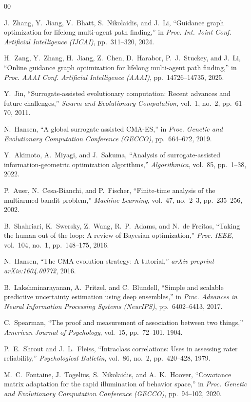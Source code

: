 \documentclass[conference]{IEEEtran}
\begin{document}

\begin{thebibliography}{00}

J.~Zhang, Y.~Jiang, V.~Bhatt, S.~Nikolaidis, and J.~Li,
``Guidance graph optimization for lifelong multi-agent path finding,''
in \textit{Proc. Int. Joint Conf. Artificial Intelligence (IJCAI)},
pp.~311--320, 2024.

H.~Zang, Y.~Zhang, H.~Jiang, Z.~Chen, D.~Harabor, P.~J.~Stuckey,
and J.~Li, ``Online guidance graph optimization for lifelong
multi-agent path finding,'' in \textit{Proc. AAAI Conf. Artificial
Intelligence (AAAI)}, pp.~14726--14735, 2025.

Y.~Jin, ``Surrogate-assisted evolutionary computation: Recent advances and
future challenges,'' \textit{Swarm and Evolutionary Computation}, vol.~1,
no.~2, pp.~61--70, 2011.

N.~Hansen, ``A global surrogate assisted {CMA-ES},'' in \textit{Proc.
Genetic and Evolutionary Computation Conference (GECCO)}, pp.~664--672,
2019.

Y.~Akimoto, A.~Miyagi, and J.~Sakuma, ``Analysis of surrogate-assisted
information-geometric optimization algorithms,'' \textit{Algorithmica},
vol.~85, pp.~1--38, 2022.

P.~Auer, N.~Cesa-Bianchi, and P.~Fischer, ``Finite-time analysis of the
multiarmed bandit problem,'' \textit{Machine Learning}, vol.~47,
no.~2--3, pp.~235--256, 2002.

B.~Shahriari, K.~Swersky, Z.~Wang, R.~P.~Adams, and N.~de Freitas,
``Taking the human out of the loop: A review of Bayesian optimization,''
\textit{Proc. IEEE}, vol.~104, no.~1, pp.~148--175, 2016.

N.~Hansen, ``The CMA evolution strategy: A tutorial,''
\textit{arXiv preprint arXiv:1604.00772}, 2016.

B.~Lakshminarayanan, A.~Pritzel, and C.~Blundell,
``Simple and scalable predictive uncertainty estimation using deep
ensembles,'' in \textit{Proc. Advances in Neural Information Processing
Systems (NeurIPS)}, pp.~6402--6413, 2017.

C.~Spearman, ``The proof and measurement of association between two things,''
\textit{American Journal of Psychology}, vol.~15, pp.~72--101, 1904.

P.~E.~Shrout and J.~L.~Fleiss, ``Intraclass correlations: Uses in
assessing rater reliability,'' \textit{Psychological Bulletin},
vol.~86, no.~2, pp.~420--428, 1979.

M.~C.~Fontaine, J.~Togelius, S.~Nikolaidis, and A.~K.~Hoover,
``Covariance matrix adaptation for the rapid illumination of behavior
space,'' in \textit{Proc. Genetic and Evolutionary Computation
Conference (GECCO)}, pp.~94--102, 2020.

\end{thebibliography}
\end{document}
